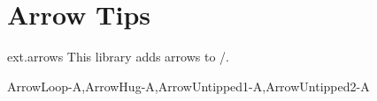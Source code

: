 %
%
%

\section{Arrow Tips}
\label{pgflibrary:arrows}
\tikzset{external/export/.try=false}%
\begin{pgflibrary}{ext.arrows}
  This library adds arrows to \pgfname/\tikzname.
  
              {ArrowLoop-A,ArrowHug-A,ArrowUntipped1-A,ArrowUntipped2-A}
\end{pgflibrary}
